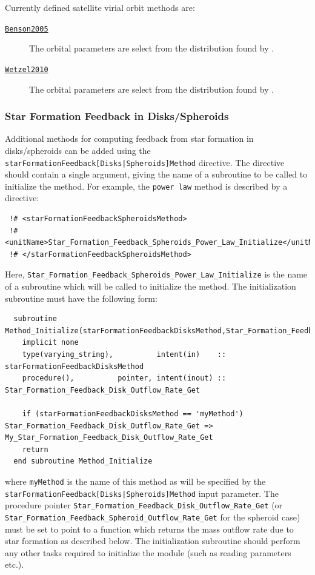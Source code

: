 Currently defined satellite virial orbit methods are:
\begin{description}
 \item [\hyperlink{satellites.merging.virial_orbits.Benson2005.F90:virial_orbits_benson2005:virial_orbital_parameters_benson2005}{{\tt Benson2005}}] The orbital parameters are select from the distribution found by \cite{benson_orbital_2005}.
 \item [\hyperlink{satellites.merging.virial_orbits.Wetzel2010.F90:virial_orbits_wetzel2010:virial_orbital_parameters_wetzel2010}{{\tt Wetzel2010}}] The orbital parameters are select from the distribution found by \cite{wetzel_orbits_2010}.
\end{description}

\subsubsection{Star Formation Feedback in Disks/Spheroids}

Additional methods for computing feedback from star formation in disks/spheroids can be added using the {\tt starFormationFeedback[Disks|Spheroids]Method} directive. The directive should contain a single argument, giving the name of a subroutine to be called to initialize the method. For example, the {\tt power law} method is described by a directive:
\begin{verbatim}
 !# <starFormationFeedbackSpheroidsMethod>
 !#  <unitName>Star_Formation_Feedback_Spheroids_Power_Law_Initialize</unitName>
 !# </starFormationFeedbackSpheroidsMethod>
\end{verbatim}
Here, {\tt Star\_Formation\_Feedback\_Spheroids\_Power\_Law\_Initialize} is the name of a subroutine which will be called to initialize the method. The initialization subroutine must have the following form:
\begin{verbatim}
  subroutine Method_Initialize(starFormationFeedbackDisksMethod,Star_Formation_Feedback_Disk_Outflow_Rate_Get)
    implicit none
    type(varying_string),          intent(in)    :: starFormationFeedbackDisksMethod
    procedure(),          pointer, intent(inout) :: Star_Formation_Feedback_Disk_Outflow_Rate_Get
    
    if (starFormationFeedbackDisksMethod == 'myMethod') Star_Formation_Feedback_Disk_Outflow_Rate_Get => My_Star_Formation_Feedback_Disk_Outflow_Rate_Get
    return
  end subroutine Method_Initialize
\end{verbatim}
where {\tt myMethod} is the name of this method as will be specified by the {\tt starFormationFeedback[Disks|Spheroids]Method} input parameter. The procedure pointer {\tt Star\_Formation\_Feedback\_Disk\_Outflow\_Rate\_Get} (or {\tt Star\_Formation\_Feedback\_Spheroid\_Outflow\_Rate\_Get} for the spheroid case) must be set to point to a function which returns the mass outflow rate due to star formation as described below. The initialization subroutine should perform any other tasks required to initialize the module (such as reading parameters etc.).

